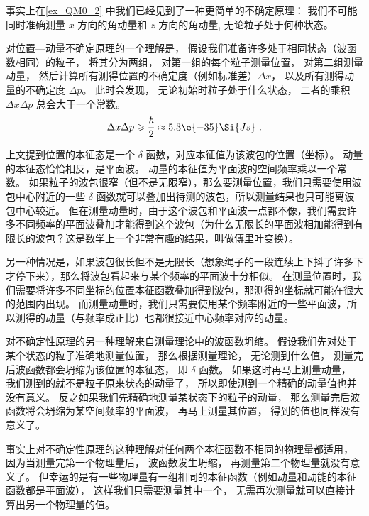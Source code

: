 事实上在\autoref{ex_QM0_2} 中我们已经见到了一种更简单的不确定原理： 我们不可能同时准确测量 $x$ 方向的角动量和 $z$ 方向的角动量, 无论粒子处于何种状态。

对位置—动量不确定原理的一个理解是， 假设我们准备许多处于相同状态（波函数相同）的粒子， 将其分为两组， 对第一组的每个粒子测量位置， 对第二组测量动量， 然后计算所有测得位置的不确定度（例如标准差）$\Delta x$， 以及所有测得动量的不确定度 $\Delta p$。 此时会发现， 无论初始时粒子处于什么状态， 二者的乘积 $\Delta x \Delta p$ 总会大于一个常数。
\begin{equation}
\Delta x \Delta p \geqslant \frac{\hbar}{2} \approx 5.3\e{-35} \Si{Js}~.
\end{equation}

上文提到位置的本征态是一个 $\delta$ 函数，对应本征值为该波包的位置（坐标）。 动量的本征态恰恰相反，是平面波。 动量的本征值为平面波的空间频率乘以一个常数。 如果粒子的波包很窄（但不是无限窄），那么要测量位置，我们只需要使用波包中心附近的一些 $\delta$ 函数就可以叠加出待测的波包，所以测量结果也只可能离波包中心较近。 但在测量动量时，由于这个波包和平面波一点都不像，我们需要许多不同频率的平面波叠加才能得到这个波包（为什么无限长的平面波相加能得到有限长的波包？这是数学上一个非常有趣的结果，叫做傅里叶变换）。

另一种情况是，如果波包很长但不是无限长（想象绳子的一段连续上下抖了许多下才停下来），那么将波包看起来与某个频率的平面波十分相似。 在测量位置时，我们需要将许多不同坐标的位置本征函数叠加得到波包，那测得的坐标就可能在很大的范围内出现。 而测量动量时，我们只需要使用某个频率附近的一些平面波，所以测得的动量（与频率成正比）也都很接近中心频率对应的动量。

对不确定性原理的另一种理解来自测量理论中的波函数坍缩。 假设我们先对处于某个状态的粒子准确地测量位置， 那么根据测量理论， 无论测到什么值， 测量完后波函数都会坍缩为该位置的本征态， 即 $\delta$ 函数。 如果这时再马上测量动量， 我们测到的就不是粒子原来状态的动量了， 所以即使测到一个精确的动量值也并没有意义。 反之如果我们先精确地测量某状态下的粒子的动量， 那么测量完后波函数将会坍缩为某空间频率的平面波， 再马上测量其位置， 得到的值也同样没有意义了。

事实上对不确定性原理的这种理解对任何两个本征函数不相同的物理量都适用， 因为当测量完第一个物理量后， 波函数发生坍缩， 再测量第二个物理量就没有意义了。 但幸运的是有一些物理量有一组相同的本征函数（例如动量和动能的本征函数都是平面波）， 这样我们只需要测量其中一个， 无需再次测量就可以直接计算出另一个物理量的值。
